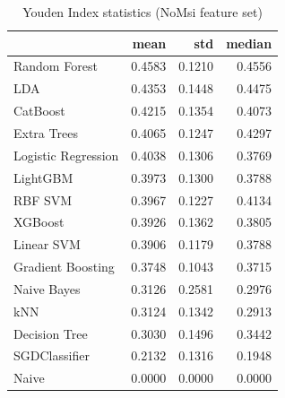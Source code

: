 \begin{table}
\caption{Youden Index statistics (NoMsi feature set)}
\label{tab:youden_NoMsi_stats}
\begin{tabular}{lrrr}
\toprule
 & mean & std & median \\
\midrule
Random Forest & 0.4583 & 0.1210 & 0.4556 \\
LDA & 0.4353 & 0.1448 & 0.4475 \\
CatBoost & 0.4215 & 0.1354 & 0.4073 \\
Extra Trees & 0.4065 & 0.1247 & 0.4297 \\
Logistic Regression & 0.4038 & 0.1306 & 0.3769 \\
LightGBM & 0.3973 & 0.1300 & 0.3788 \\
RBF SVM & 0.3967 & 0.1227 & 0.4134 \\
XGBoost & 0.3926 & 0.1362 & 0.3805 \\
Linear SVM & 0.3906 & 0.1179 & 0.3788 \\
Gradient Boosting & 0.3748 & 0.1043 & 0.3715 \\
Naive Bayes & 0.3126 & 0.2581 & 0.2976 \\
kNN & 0.3124 & 0.1342 & 0.2913 \\
Decision Tree & 0.3030 & 0.1496 & 0.3442 \\
SGDClassifier & 0.2132 & 0.1316 & 0.1948 \\
Naive & 0.0000 & 0.0000 & 0.0000 \\
\bottomrule
\end{tabular}
\end{table}
